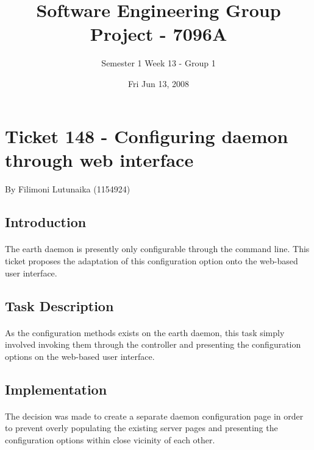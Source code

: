 \documentclass[oneside, 10pt, a4]{article}
\begin{document}
\title{Software Engineering Group Project - 7096A}
\author{Semester 1 Week 13 - Group 1}
\date{Fri Jun 13, 2008}

\maketitle

\section*{Ticket 148 - Configuring daemon through web interface}

\paragraph{} By Filimoni Lutunaika (1154924)


\subsection*{Introduction}

\paragraph{}
The earth daemon is presently only configurable through the command line. This ticket proposes the adaptation
of this configuration option onto the web-based user interface.

\subsection*{Task Description}

\paragraph{}
As the configuration methods exists on the earth daemon, this task simply involved invoking them through the controller
and presenting the configuration options on the web-based user interface.

\subsection*{Implementation}

\paragraph{}
The decision was made to create a separate daemon configuration page in order to prevent overly populating
the existing server pages and presenting the configuration options within close vicinity of each other.
\end{document}
